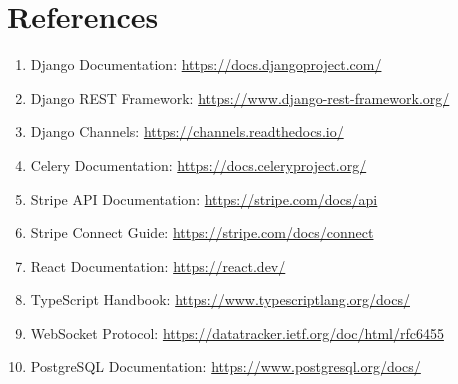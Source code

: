 \documentclass[12pt,a4paper]{article}
\begin{document}
\section{References}

\begin{enumerate}
    \item Django Documentation: \url{https://docs.djangoproject.com/}
    \item Django REST Framework: \url{https://www.django-rest-framework.org/}
    \item Django Channels: \url{https://channels.readthedocs.io/}
    \item Celery Documentation: \url{https://docs.celeryproject.org/}
    \item Stripe API Documentation: \url{https://stripe.com/docs/api}
    \item Stripe Connect Guide: \url{https://stripe.com/docs/connect}
    \item React Documentation: \url{https://react.dev/}
    \item TypeScript Handbook: \url{https://www.typescriptlang.org/docs/}
    \item WebSocket Protocol: \url{https://datatracker.ietf.org/doc/html/rfc6455}
    \item PostgreSQL Documentation: \url{https://www.postgresql.org/docs/}
\end{enumerate}
\end{document}
